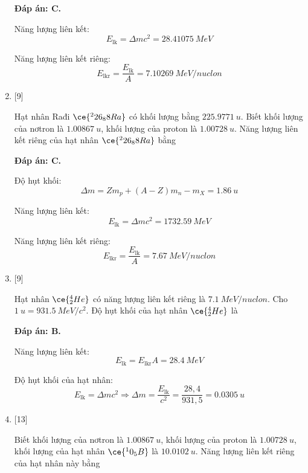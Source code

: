 \begin{enumerate}[label=\bfseries Câu \arabic*:]
	\loigiai
	{		\textbf{Đáp án: C.}
		
		
		Năng lượng liên kết:
		$$E_\text{lk} = \Delta m c^2 = \SI{28.41075}{MeV}$$
		
		Năng lượng liên kết riêng:
		$$E_\text{lkr} = \dfrac{E_\text{lk}}{A} =\SI{7.10269}{MeV/nuclon} $$
	}
	
	\item {} [9]
	\cauhoi
	{Hạt nhân Rađi $\ce{^226_88 Ra}$ có khối lượng bằng $\SI{225.9771}{u}$. Biết khối lượng của nơtron là $\SI{1.00867}{u}$, khối lượng của proton là $\SI{1.00728}{u}$. Năng lượng liên kết riêng của hạt nhân $\ce{^226_88 Ra}$ bằng
	}
	
	\loigiai
	{		\textbf{Đáp án: C.}
		
		Độ hụt khối:
		$$\Delta m = Zm_p + (A-Z)m_n - m_X = \SI{1.86}{u}$$
		
		Năng lượng liên kết:
		$$E_\text{lk} = \Delta m c^2 = \SI{1732.59}{MeV}$$
		
		Năng lượng liên kết riêng:
		$$E_\text{lkr} = \dfrac{E_\text{lk}}{A} =\SI{7.67}{MeV/nuclon} $$
		
	}
	\item {} [9]
	\cauhoi
	{Hạt nhân $\ce{^4_2 He}$ có năng lượng liên kết riêng là $\SI{7.1}{MeV/nuclon}$. Cho $\SI{1}{u} = \SI{931.5}{MeV/c^2}$. Độ hụt khối của hạt nhân $\ce{^4_2 He}$ là
	}
	
	\loigiai
	{		\textbf{Đáp án: B.}
		
		Năng lượng liên kết:
		$$E_\text{lk} = E_\text{lkr} A = \SI{28.4}{MeV}$$
		
		Độ hụt khối của hạt nhân:
		$$E_\text{lk} = \Delta m c^2 \Rightarrow \Delta m = \dfrac{E_\text{lk}}{c^2} = \dfrac{28,4}{931,5} = \SI{0.0305}{u}$$
		
	}
	\item {} [13]
	\cauhoi
	{Biết khối lượng của nơtron là $\SI{1.00867}{u}$, khối lượng của proton là $\SI{1.00728}{u}$, khối lượng của hạt nhân $\ce{^10_5 B}$ là $\SI{10.0102}{u}$. Năng lượng liên kết riêng của hạt nhân này bằng
	}
	

\end{enumerate}
